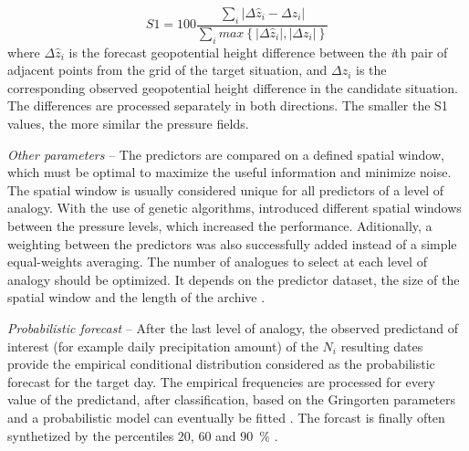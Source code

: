 \documentclass[review]{elsarticle}
\begin{document}
\begin{equation}
\label{eq:S1}
S1=100 \frac {\displaystyle \sum_{i} \vert \Delta\hat{z}_{i} - \Delta z_{i} \vert}
{\displaystyle \sum_{i} max\left\lbrace \vert \Delta\hat{z}_{i} \vert , \vert \Delta z_{i} \vert \right\rbrace }
\end{equation}
where $\Delta \hat{z}_{i}$ is the forecast geopotential height difference between the \textit{i}th pair of adjacent points from the grid of the target situation, and $\Delta z_{i}$ is the corresponding observed geopotential height difference in the candidate situation. The differences are processed separately in both directions. The smaller the S1 values, the more similar the pressure fields.

\textit{Other parameters} -- The predictors are compared on a defined spatial window, which must be optimal to maximize the useful information and minimize noise. The spatial window is usually considered unique for all predictors of a level of analogy. With the use of genetic algorithms, \citet{Horton2018a} introduced different spatial windows between the pressure levels, which increased the performance. Aditionally, a weighting between the predictors was also successfully added instead of a simple equal-weights averaging. The number of analogues to select at each level of analogy should be optimized. It depends on the predictor dataset, the size of the spatial window and the length of the archive \citet{Ruosteenoja1988, Vandendool1994}.

\textit{Probabilistic forecast} -- After the last level of analogy, the observed predictand of interest (for example daily precipitation amount) of the $N_{i}$ resulting dates provide the empirical conditional distribution considered as the probabilistic forecast for the target day. The empirical frequencies are processed for every value of the predictand, after classification, based on the Gringorten parameters \cite[for a Gumbel or exponential law; see][]{Gringorten1963} and a probabilistic model can eventually be fitted \citep[e.g. Gamma function,][]{Obled2002}. The forcast is finally often synthetized by the percentiles 20, 60 and 90~\% \citep{Guilbaud1997, Guilbaud1998}.
\end{document}
